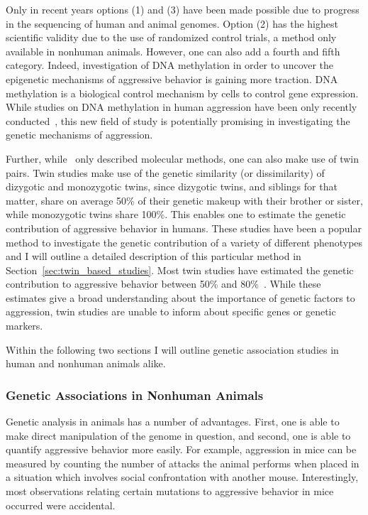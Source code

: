 Only in recent years options (1) and (3) have been made possible due to progress in the sequencing of human and animal genomes.
Option (2) has the highest scientific validity due to the use of randomized control trials, a method only available in nonhuman animals.
However, one can also add a fourth and fifth category.
Indeed, investigation of DNA methylation in order to uncover the epigenetic mechanisms of aggressive behavior is gaining more traction.
DNA methylation is a biological control mechanism by cells to control gene expression.
While studies on DNA methylation in human aggression have been only recently  conducted~\cite{VanDongen2015a}, this new field of study is potentially promising in investigating the genetic mechanisms of aggression.

Further, while~\citet{Maxson2005} only described molecular methods, one can also make use of twin pairs.
Twin studies make use of the genetic similarity (or dissimilarity) of dizygotic and monozygotic twins, since dizygotic twins, and siblings for that matter, share on average 50\% of their genetic makeup with their brother or sister, while monozygotic twins share 100\%.
This enables one to estimate the genetic contribution of aggressive behavior in humans.
These studies have been a popular method to investigate the genetic contribution of a variety of different phenotypes and I will outline a detailed description of this particular method in Section~\ref{sec:twin_based_studies}. 
Most twin studies have estimated the genetic contribution to aggressive behavior between 50\% and 80\%~\cite{Porsch2016}.
While these estimates give a broad understanding about the importance of genetic factors  to aggression, twin studies are unable to inform about specific genes or genetic markers.

Within the following two sections I will outline genetic association studies in human and nonhuman animals alike.

\subsubsection{Genetic Associations in Nonhuman Animals}
\label{ssub:genetic_associations_in_animals}

Genetic analysis in animals has a number of advantages.
First, one is able to make direct manipulation of the genome in question, and second, one is able to quantify aggressive behavior more easily.
For example, aggression in mice can be measured by counting the number of attacks the animal performs when placed in a situation which involves social confrontation with another mouse.
Interestingly, most observations relating certain mutations to aggressive behavior in mice occurred were accidental.  

